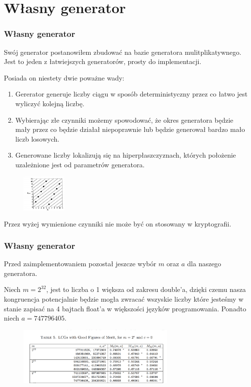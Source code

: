 \documentclass[9pt]{beamer}
\begin{document}
\section{Własny generator}
\begin{frame}
  \frametitle{Własny generator}
    Swój generator postanowiłem zbudować na bazie generatora mulitplikatywnego. Jest to jeden z łatwiejszych generatorów, prosty do implementacji. 
    
    Posiada on niestety dwie poważne wady:
    \begin{enumerate}
      \item Gererator generuje liczby ciągu w sposób deterministyczny przez co łatwo jest wyliczyć kolejną liczbę.
      \item Wybierając złe czynniki możemy spowodować, że okres generatora będzie mały przez co będzie działał niepoprawnie lub będzie generował bardzo mało liczb losowych.
      \item Generowane liczby lokalizują się na hiperpłaszczyznach, których położenie uzależnione jest od parametrów generatora.
    \end{enumerate} 
    \begin{figure}[h]
      \begin{center}
      \includegraphics[width=0.2\textwidth]{assets/1.PNG}
      \end{center}
      \end{figure}
    Przez wyżej wymienione czynniki nie może być on stosowany w kryptografii.
\end{frame}
\begin{frame}
  \frametitle{Własny generator}
  Przed zaimplementowaniem pozostał jeszcze wybór $m$ oraz $a$ dla naszego generatora.

  Niech $m=2^{32}$, jest to liczba o 1 większa od zakresu double'a, dzięki czemu nasza kongruencja potencjalnie będzie mogła zwracać wszyskie liczby które jesteśmy w stanie zapisać na 4 bajtach float'a w większości języków programowania. Ponadto niech $a=747796405.$
  \begin{figure}[h]
    \begin{center}
    \includegraphics[width=0.7\textwidth]{assets/table.PNG}
    \end{center}
    \end{figure}
\end{frame}
\end{document}
